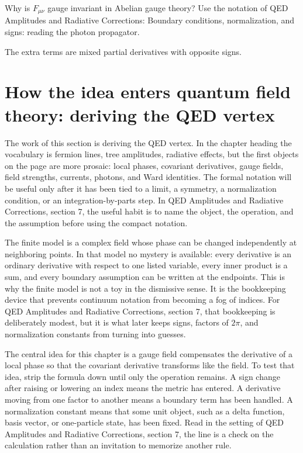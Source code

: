 \begin{exercise}
Why is \(F_{\mu\nu}\) gauge invariant in Abelian gauge theory?  Use the notation of QED Amplitudes and Radiative Corrections: Boundary conditions, normalization, and signs: reading the photon propagator.
\begin{answer}
The extra terms are mixed partial derivatives with opposite signs.
\end{answer}
\end{exercise}



\section{How the idea enters quantum field theory: deriving the QED vertex}

The work of this section is deriving the QED vertex.  In the chapter heading the vocabulary is fermion lines, tree amplitudes, radiative effects, but the first objects on the page are more prosaic: local phases, covariant derivatives, gauge fields, field strengths, currents, photons, and Ward identities.  The formal notation will be useful only after it has been tied to a limit, a symmetry, a normalization condition, or an integration-by-parts step.  In QED Amplitudes and Radiative Corrections, section 7, the useful habit is to name the object, the operation, and the assumption before using the compact notation.

The finite model is a complex field whose phase can be changed independently at neighboring points.  In that model no mystery is available: every derivative is an ordinary derivative with respect to one listed variable, every inner product is a sum, and every boundary assumption can be written at the endpoints.  This is why the finite model is not a toy in the dismissive sense.  It is the bookkeeping device that prevents continuum notation from becoming a fog of indices.  For QED Amplitudes and Radiative Corrections, section 7, that bookkeeping is deliberately modest, but it is what later keeps signs, factors of \(2\pi\), and normalization constants from turning into guesses.

The central idea for this chapter is a gauge field compensates the derivative of a local phase so that the covariant derivative transforms like the field.  To test that idea, strip the formula down until only the operation remains.  A sign change after raising or lowering an index means the metric has entered.  A derivative moving from one factor to another means a boundary term has been handled.  A normalization constant means that some unit object, such as a delta function, basis vector, or one-particle state, has been fixed.  Read in the setting of QED Amplitudes and Radiative Corrections, section 7, the line is a check on the calculation rather than an invitation to memorize another rule.

